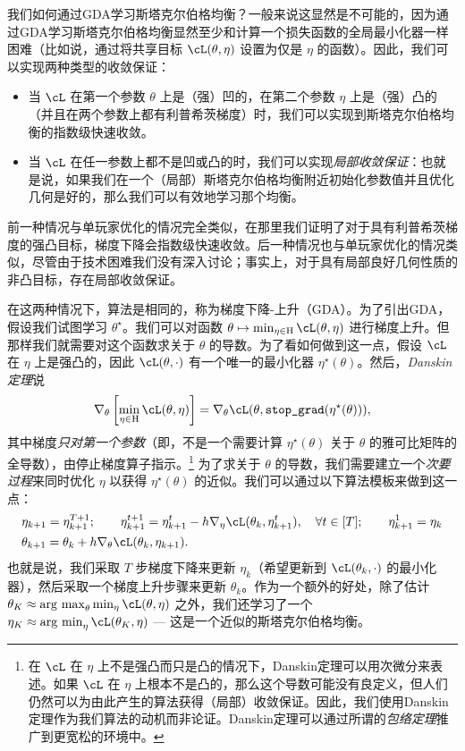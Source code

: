 \documentclass[../../book-main_zh.tex]{subfiles}
\begin{document}
我们如何通过GDA学习斯塔克尔伯格均衡？一般来说这显然是不可能的，因为通过GDA学习斯塔克尔伯格均衡显然至少和计算一个损失函数的全局最小化器一样困难（比如说，通过将共享目标 \(\cL(\theta, \eta)\) 设置为仅是 \(\eta\) 的函数）。因此，我们可以实现两种类型的收敛保证：
\begin{itemize}
    \item 当 \(\cL\) 在第一个参数 \(\theta\) 上是（强）凹的，在第二个参数 \(\eta\) 上是（强）凸的（并且在两个参数上都有利普希茨梯度）时，我们可以实现到斯塔克尔伯格均衡的指数级快速收敛。
    \item 当 \(\cL\) 在任一参数上都不是凹或凸的时，我们可以实现\textit{局部收敛保证}：也就是说，如果我们在一个（局部）斯塔克尔伯格均衡附近初始化参数值并且优化几何是好的，那么我们可以有效地学习那个均衡。
\end{itemize}

前一种情况与单玩家优化的情况完全类似，在那里我们证明了对于具有利普希茨梯度的强凸目标，梯度下降会指数级快速收敛。后一种情况也与单玩家优化的情况类似，尽管由于技术困难我们没有深入讨论；事实上，对于具有局部良好几何性质的非凸目标，存在局部收敛保证。

在这两种情况下，算法是相同的，称为梯度下降-上升（GDA）。为了引出GDA，假设我们试图学习 \(\theta^{\star}\)。我们可以对函数 \(\theta \mapsto \min_{\eta \in \Eta}\cL(\theta, \eta)\) 进行梯度上升。但那样我们就需要对这个函数求关于 \(\theta\) 的导数。为了看如何做到这一点，假设 \(\cL\) 在 \(\eta\) 上是强凸的，因此 \(\cL(\theta, \cdot)\) 有一个唯一的最小化器 \(\eta^{\star}(\theta)\)。然后，\textit{Danskin定理}说
\begin{equation}
    \nabla_{\theta}\bs{\min_{\eta \in \Eta}\cL(\theta, \eta)} = \nabla_{\theta}\cL(\theta, \texttt{stop\_grad}(\eta^{\star}(\theta))),
\end{equation}
其中梯度\textit{只对第一个参数}（即，不是一个需要计算 \(\eta^{\star}(\theta)\) 关于 \(\theta\) 的雅可比矩阵的全导数），由停止梯度算子指示。\footnote{在 \(\cL\) 在 \(\eta\) 上不是强凸而只是凸的情况下，Danskin定理可以用次微分来表述。如果 \(\cL\) 在 \(\eta\) 上根本不是凸的，那么这个导数可能没有良定义，但人们仍然可以为由此产生的算法获得（局部）收敛保证。因此，我们使用Danskin定理作为我们算法的动机而非论证。Danskin定理可以通过所谓的\textit{包络定理}推广到更宽松的环境中。}
为了求关于 \(\theta\) 的导数，我们需要建立一个\textit{次要过程}来同时优化 \(\eta\) 以获得 \(\eta^{\star}(\theta)\) 的近似。我们可以通过以下算法模板来做到这一点：
\begin{align}
    &\eta_{k + 1} = \eta_{k + 1}^{T + 1}; \qquad \eta_{k + 1}^{t + 1} = \eta_{k + 1}^{t} - h \nabla_{\eta} \cL(\theta_{k}, \eta_{k + 1}^{t}), \quad \forall t \in [T]; \qquad \eta_{k + 1}^{1} = \eta_{k} \\
    &\theta_{k + 1} = \theta_{k} + h \nabla_{\theta}\cL(\theta_{k}, \eta_{k + 1}).
\end{align}
也就是说，我们采取 \(T\) 步梯度下降来更新 \(\eta_{k}\)（希望更新到 \(\cL(\theta_{k}, \cdot)\) 的最小化器），然后采取一个梯度上升步骤来更新 \(\theta_{k}\)。作为一个额外的好处，除了估计 \(\theta_{K} \approx \argmax_{\theta}\min_{\eta}\cL(\theta, \eta)\) 之外，我们还学习了一个 \(\eta_{K} \approx \argmin_{\eta}\cL(\theta_{K}, \eta)\) --- 这是一个近似的斯塔克尔伯格均衡。
\end{document}
